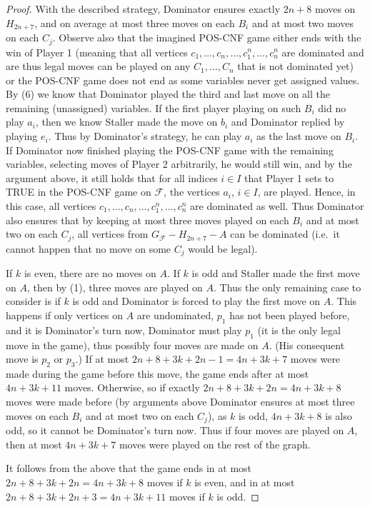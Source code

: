 \documentclass[12pt]{article}
\newcommand{\F}{\mathcal{F}}
\begin{document}
\begin{proof}
	With the described strategy, Dominator ensures exactly $2n+8$ moves on $H_{2n+7}$, and on average at most three moves on each $B_i$ and at most two moves on each $C_j$. Observe also that the imagined POS-CNF game either ends with the win of Player 1 (meaning that all vertices $c_1, \ldots, c_n, \ldots, c_1^n, \ldots, c_n^n$ are dominated and are thus legal moves can be played on any $C_1, \ldots, C_n$ that is not dominated yet) or the POS-CNF game does not end as some variables never get assigned values. By (6) we know that Dominator played the third and last move on all the remaining (unassigned) variables. If the first player playing on such $B_i$ did no play $a_i$, then we know Staller made the move on $b_i$ and Dominator replied by playing $e_i$. Thus by Dominator's strategy, he can play $a_i$ as the last move on $B_i$. If Dominator now finished playing the POS-CNF game with the remaining variables, selecting moves of Player 2 arbitrarily, he would still win, and by the argument above, it still holds that for all indices $i \in I$ that Player 1 sets to TRUE in the POS-CNF game on $\F$, the vertices $a_i$, $i \in I$, are played. Hence, in this case, all vertices $c_1, \ldots, c_n, \ldots, c_1^n, \ldots, c_n^n$ are dominated as well. Thus Dominator also ensures that by keeping at most three moves played on each $B_i$ and at most two on each $C_j$, all vertices from $G_\F - H_{2n+7} - A$ can be dominated (i.e.\ it cannot happen that no move on some $C_j$ would be legal). 
	
	If $k$ is even, there are no moves on $A$. If $k$ is odd and Staller made the first move on $A$, then by (1), three moves are played on $A$. Thus the only remaining case to consider is if $k$ is odd and Dominator is forced to play the first move on $A$. 	This happens if only vertices on $A$ are undominated, $p_1$ has not been played before, and it is Dominator's turn now, Dominator must play $p_1$ (it is the only legal move in the game), thus possibly four moves are made on $A$. (His consequent move is $p_2$ or $p_3$.) If at most $2n+8+3k+2n-1 = 4n+3k+7$ moves were made during the game before this move, the game ends after at most $4n+3k+11$ moves. Otherwise, so if exactly $2n+8+3k+2n = 4n+3k+8$ moves were made before (by arguments above Dominator ensures at most three moves on each $B_i$ and at most two on each $C_j$), as $k$ is odd, $4n+3k+8$ is also odd, so it cannot be Dominator's turn now. Thus if four moves are played on $A$, then at most $4n+3k+7$ moves were played on the rest of the graph.

	It follows from the above that the game ends in at most $2n+8+3k+2n = 4n+3k+8$ moves if $k$ is even, and in at most $2n+8+3k+2n+3=4n+3k+11$ moves if $k$ is odd.	
\end{proof}
\end{document}
